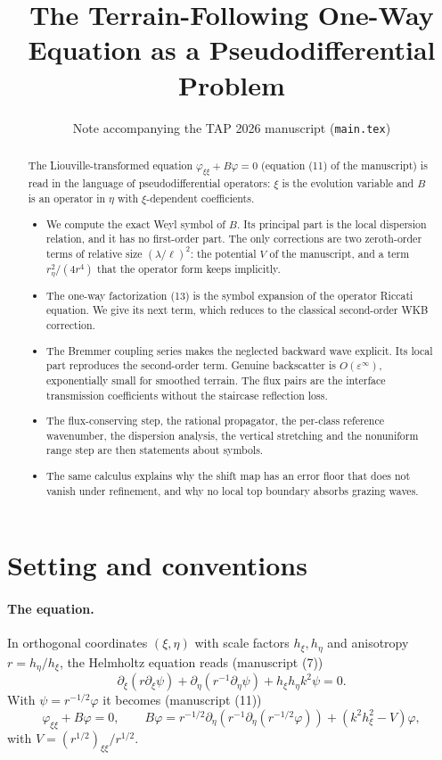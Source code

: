 \documentclass[11pt]{article}
\title{The Terrain-Following One-Way Equation as a Pseudodifferential Problem}
\author{Note accompanying the TAP 2026 manuscript (\texttt{main.tex})}
\date{}
\newcommand{\pd}{\partial}
\begin{document}
\maketitle

\begin{abstract}
The Liouville-transformed equation $\varphi_{\xi\xi}+B\varphi=0$ (equation
(11) of the manuscript) is read in the language of pseudodifferential
operators: $\xi$ is the evolution variable and $B$ is an operator in $\eta$
with $\xi$-dependent coefficients.
\begin{itemize}
\item We compute the exact Weyl symbol of $B$. Its principal part is the local
  dispersion relation, and it has no first-order part. The only corrections are
  two zeroth-order terms of relative size $(\lambda/\ell)^2$: the potential $V$
  of the manuscript, and a term $r_\eta^2/(4r^4)$ that the operator form keeps
  implicitly.
\item The one-way factorization (13) is the symbol expansion of the operator
  Riccati equation. We give its next term, which reduces to the classical
  second-order WKB correction.
\item The Bremmer coupling series makes the neglected backward wave explicit.
  Its local part reproduces the second-order term. Genuine backscatter is
  $O(\varepsilon^\infty)$, exponentially small for smoothed terrain. The flux
  pairs are the interface transmission coefficients without the staircase
  reflection loss.
\item The flux-conserving step, the rational propagator, the per-class
  reference wavenumber, the dispersion analysis, the vertical stretching and the
  nonuniform range step are then statements about symbols.
\item The same calculus explains why the shift map has an error floor that does
  not vanish under refinement, and why no local top boundary absorbs grazing
  waves.
\end{itemize}
\end{abstract}

\section{Setting and conventions}

\paragraph{The equation.} In orthogonal coordinates $(\xi,\eta)$ with scale factors
$h_\xi,h_\eta$ and anisotropy $r=h_\eta/h_\xi$, the Helmholtz equation reads
(manuscript (7))
\begin{equation}\label{eq:helm}
\pd_\xi(r\pd_\xi\psi)+\pd_\eta(r^{-1}\pd_\eta\psi)+h_\xi h_\eta k^2\psi=0 .
\end{equation}
With $\psi=r^{-1/2}\varphi$ it becomes (manuscript (11))
\begin{equation}\label{eq:liou}
\varphi_{\xi\xi}+B\varphi=0,\qquad
B\varphi=r^{-1/2}\pd_\eta\!\left(r^{-1}\pd_\eta(r^{-1/2}\varphi)\right)+(k^2h_\xi^2-V)\varphi,
\end{equation}
with $V=(r^{1/2})_{\xi\xi}/r^{1/2}$.
\end{document}
